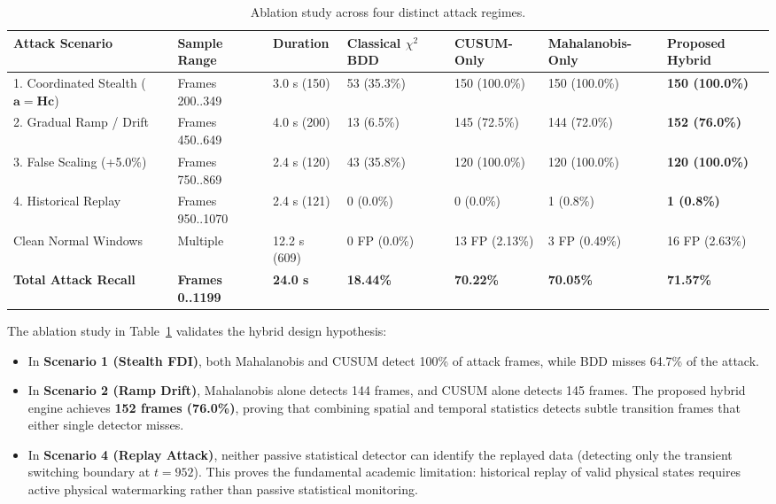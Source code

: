 \documentclass[11pt,a4paper]{report}
\begin{document}
\begin{table}[H]
\centering
\caption{Ablation study across four distinct attack regimes.}
\label{tab:ablation_study}
\small
\renewcommand{\arraystretch}{1.25}
\begin{tabular}{|p{3.8cm}|p{1.8cm}|p{1.6cm}|p{2.0cm}|p{1.8cm}|p{1.8cm}|p{2.0cm}|}
\hline
\textbf{Attack Scenario} & \textbf{Sample Range} & \textbf{Duration} & \textbf{Classical $\chi^2$ BDD} & \textbf{CUSUM-Only} & \textbf{Mahalanobis-Only} & \textbf{Proposed Hybrid} \\
\hline
1. Coordinated Stealth ($\boldsymbol{a}=\boldsymbol{H}\boldsymbol{c}$) & Frames 200..349 & 3.0 s (150) & 53 (35.3\%) & 150 (100.0\%) & 150 (100.0\%) & \textbf{150 (100.0\%)} \\
\hline
2. Gradual Ramp / Drift & Frames 450..649 & 4.0 s (200) & 13 (6.5\%) & 145 (72.5\%) & 144 (72.0\%) & \textbf{152 (76.0\%)} \\
\hline
3. False Scaling (+5.0\%) & Frames 750..869 & 2.4 s (120) & 43 (35.8\%) & 120 (100.0\%) & 120 (100.0\%) & \textbf{120 (100.0\%)} \\
\hline
4. Historical Replay & Frames 950..1070 & 2.4 s (121) & 0 (0.0\%) & 0 (0.0\%) & 1 (0.8\%) & \textbf{1 (0.8\%)} \\
\hline
Clean Normal Windows & Multiple & 12.2 s (609) & 0 FP (0.0\%) & 13 FP (2.13\%) & 3 FP (0.49\%) & 16 FP (2.63\%) \\
\hline
\textbf{Total Attack Recall} & \textbf{Frames 0..1199} & \textbf{24.0 s} & \textbf{18.44\%} & \textbf{70.22\%} & \textbf{70.05\%} & \textbf{71.57\%} \\
\hline
\end{tabular}
\end{table}

The ablation study in Table~\ref{tab:ablation_study} validates the hybrid design hypothesis:
\begin{itemize}
    \item In \textbf{Scenario 1 (Stealth FDI)}, both Mahalanobis and CUSUM detect 100\% of attack frames,
    while BDD misses 64.7\% of the attack.
    \item In \textbf{Scenario 2 (Ramp Drift)}, Mahalanobis alone detects 144 frames, and CUSUM alone
    detects 145 frames. The proposed hybrid engine achieves \textbf{152 frames (76.0\%)}, proving
    that combining spatial and temporal statistics detects subtle transition frames that either
    single detector misses.
    \item In \textbf{Scenario 4 (Replay Attack)}, neither passive statistical detector can identify
    the replayed data (detecting only the transient switching boundary at $t=952$). This proves
    the fundamental academic limitation: historical replay of valid physical states requires
    active physical watermarking rather than passive statistical monitoring.
\end{itemize}
\end{document}
